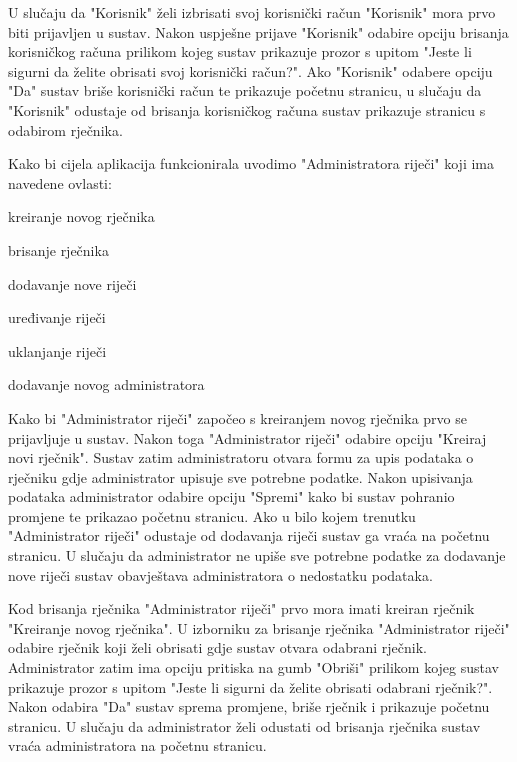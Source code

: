 U slučaju da "Korisnik" želi izbrisati svoj korisnički račun "Korisnik" mora prvo biti prijavljen u sustav. Nakon uspješne prijave "Korisnik" odabire opciju brisanja korisničkog računa prilikom kojeg sustav prikazuje prozor s upitom "Jeste li sigurni da želite obrisati svoj korisnički račun?". Ako "Korisnik" odabere opciju "Da" sustav briše korisnički račun te prikazuje početnu stranicu, u slučaju da "Korisnik" odustaje od brisanja korisničkog računa sustav prikazuje stranicu s odabirom rječnika.

Kako bi cijela aplikacija funkcionirala uvodimo "Administratora riječi" koji ima navedene ovlasti:

\begin{packed_item}
	\item  kreiranje novog rječnika
	\item  brisanje rječnika
	\item  dodavanje nove riječi
	\item  uređivanje riječi
	\item  uklanjanje riječi
	\item  dodavanje novog administratora
\end{packed_item}

Kako bi "Administrator riječi" započeo s kreiranjem novog rječnika prvo se prijavljuje u sustav. Nakon toga "Administrator riječi" odabire opciju "Kreiraj novi rječnik". Sustav zatim administratoru otvara formu za upis podataka o rječniku gdje administrator upisuje sve potrebne podatke. Nakon upisivanja podataka administrator odabire opciju "Spremi" kako bi sustav pohranio promjene te prikazao početnu stranicu. Ako u bilo kojem trenutku "Administrator riječi" odustaje od dodavanja riječi sustav ga vraća na početnu stranicu. U slučaju da administrator ne upiše sve potrebne podatke za dodavanje nove riječi sustav obavještava administratora o nedostatku podataka.

Kod brisanja rječnika "Administrator riječi" prvo mora imati kreiran rječnik "Kreiranje novog rječnika". U izborniku za brisanje rječnika "Administrator riječi" odabire rječnik koji želi obrisati gdje sustav otvara odabrani rječnik. Administrator zatim ima opciju pritiska na gumb "Obriši" prilikom kojeg sustav prikazuje prozor s upitom "Jeste li sigurni da želite obrisati odabrani rječnik?". Nakon odabira "Da" sustav sprema promjene, briše rječnik i prikazuje početnu stranicu. U slučaju da administrator želi odustati od brisanja rječnika sustav vraća administratora na početnu stranicu. 

